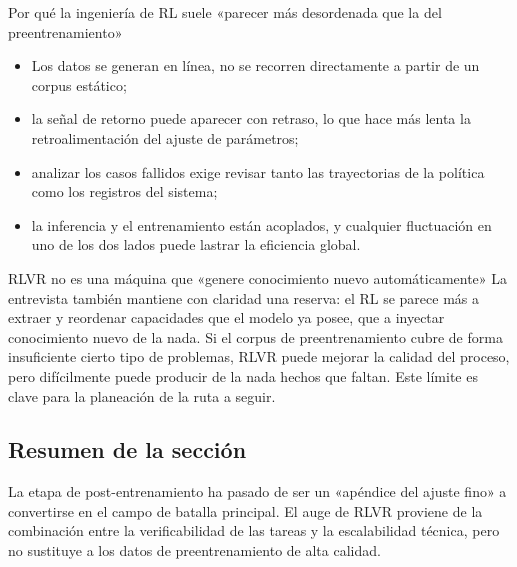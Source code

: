 \begin{knowledgebox}{Por qué la ingeniería de RL suele «parecer más desordenada que la del preentrenamiento»}
\begin{itemize}[leftmargin=1.5em]
    \item Los datos se generan en línea, no se recorren directamente a partir de un corpus estático;
    \item la señal de retorno puede aparecer con retraso, lo que hace más lenta la retroalimentación del ajuste de parámetros;
    \item analizar los casos fallidos exige revisar tanto las trayectorias de la política como los registros del sistema;
    \item la inferencia y el entrenamiento están acoplados, y cualquier fluctuación en uno de los dos lados puede lastrar la eficiencia global.
\end{itemize}
\end{knowledgebox}

\begin{warningbox}{RLVR no es una máquina que «genere conocimiento nuevo automáticamente»}
La entrevista también mantiene con claridad una reserva: el RL se parece más a extraer y reordenar capacidades que el modelo ya posee, que a inyectar conocimiento nuevo de la nada. Si el corpus de preentrenamiento cubre de forma insuficiente cierto tipo de problemas, RLVR puede mejorar la calidad del proceso, pero difícilmente puede producir de la nada hechos que faltan. Este límite es clave para la planeación de la ruta a seguir.
\end{warningbox}

\subsection{Resumen de la sección}

La etapa de post-entrenamiento ha pasado de ser un «apéndice del ajuste fino» a convertirse en el campo de batalla principal. El auge de RLVR proviene de la combinación entre la verificabilidad de las tareas y la escalabilidad técnica, pero no sustituye a los datos de preentrenamiento de alta calidad.
